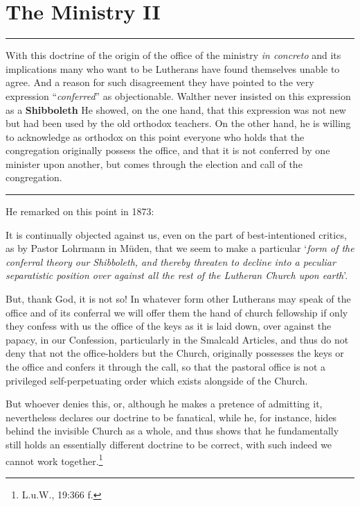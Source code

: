 \chapter{The Ministry II}

\hrule
\vspace{.30cm}
With this doctrine of the origin of the office of the ministry \textit{in concreto} and its implications many who want to be Lutherans have found themselves unable to agree.  And a reason for such disagreement they have pointed to the very expression “\textit{conferred}” as objectionable.  Walther never insisted on this expression as a \textbf{Shibboleth}  He showed, on the one hand, that this expression was not new but had been used by the old orthodox teachers.  On the other hand, he is willing to acknowledge as orthodox on this point everyone who holds that the congregation originally possess the office, and that it is not conferred by one minister upon another, but comes through the election and call of the congregation.
\vspace{.30cm}
\hrule
\vspace{1.25cm}
He remarked on this point in 1873: \begin{fancyquotes}It is continually objected against us, even on the part of best-intentioned critics, as by Pastor Lohrmann in Müden, that we seem to make a particular ‘\textit{form of the conferral theory our Shibboleth, and thereby threaten to decline into a peculiar separatistic position over against all the rest of the Lutheran Church upon earth}’. \par But, thank God, it is not so!  In whatever form other Lutherans may speak of the office and of its conferral we will offer them the hand of church fellowship if only they confess with us the office of the keys as it is laid down, over against the papacy, in our Confession, particularly in the Smalcald Articles, and thus do not deny that not the office-holders but the Church, originally possesses the keys or the office and confers it through the call, so that the pastoral office is not a privileged self-perpetuating order which exists alongside of the Church. \par But whoever denies this, or, although he makes a pretence of admitting it, nevertheless declares our doctrine to be fanatical, while he, for instance, hides behind the invisible Church as a whole, and thus shows that he fundamentally still holds an essentially different doctrine to be correct, with such indeed we cannot work together.\footnote{L.u.W., 19:366 f.}\end{fancyquotes}

